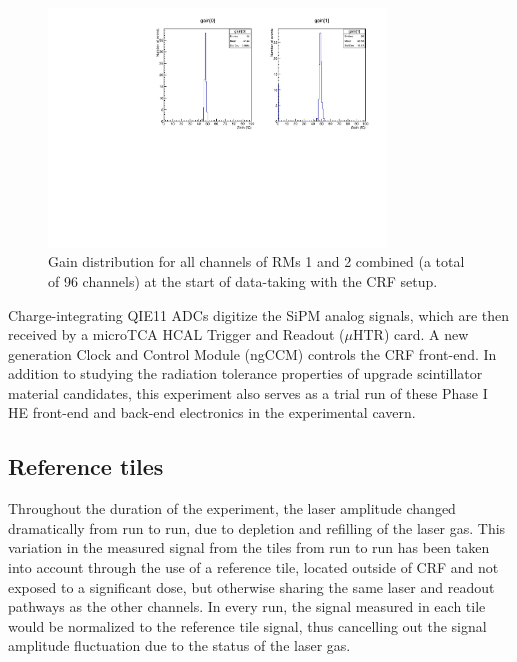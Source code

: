 \begin{figure}[hbtp]
\begin{center}
\includegraphics[width=0.8\textwidth]{figures/Run280646_RM1and2_Gains}
\caption{Gain distribution for all channels of RMs 1 and 2 combined (a total of 96 channels) at the start of data-taking with the CRF setup.}
\label{fig:gaindist}
\end{center}
\end{figure}

Charge-integrating QIE11 ADCs digitize the SiPM analog signals, which are then received by a microTCA HCAL Trigger and Readout ($\mu$HTR) card. A new generation Clock and Control Module (ngCCM) controls the CRF front-end. In addition to studying the radiation tolerance properties of upgrade scintillator material candidates, this experiment also serves as a trial run of these Phase I HE front-end and back-end electronics in the experimental cavern.

\subsection{Reference tiles\label{sec:setup-reftiles}}

Throughout the duration of the experiment, the laser amplitude changed dramatically from run to run, due to depletion and refilling of the laser gas. This variation in the measured signal from the tiles from run to run has been taken into account through the use of a reference tile, located outside of CRF and not exposed to a significant dose, but otherwise sharing the same laser and readout pathways as the other channels. In every run, the signal measured in each tile would be normalized to the reference tile signal, thus cancelling out the signal amplitude fluctuation due to the status of the laser gas.

